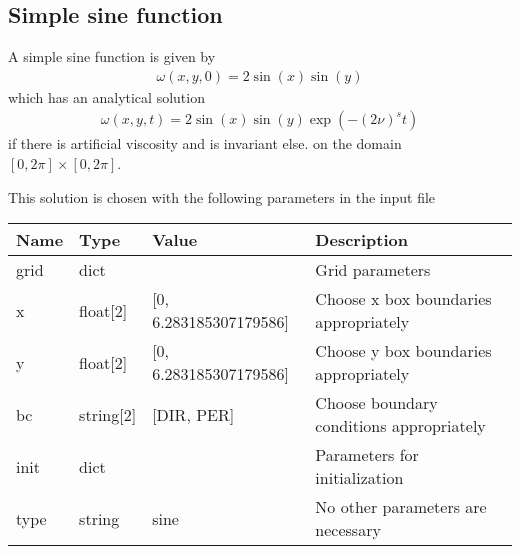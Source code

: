 \subsection{Simple sine function}
A simple sine function is given by
\begin{align}
    \omega(x,y,0) = 2 \sin(x)\sin(y)
\end{align}
which has an analytical solution
\begin{align}
\omega(x,y,t) = 2 \sin(x)\sin(y)\exp( -(2\nu)^s t)
\end{align}
if there is artificial viscosity and is invariant else.
on the domain $[0,2\pi]\times [0,2\pi]$.

This solution is chosen with the following parameters in the input file
\begin{longtable}{llll}
\toprule
\rowcolor{gray!50}\textbf{Name} &  \textbf{Type} & \textbf{Value}  & \textbf{Description}  \\ \midrule
grid & dict &  & Grid parameters \\
\qquad x & float[2]& [0, 6.283185307179586] & Choose x box boundaries appropriately \\
\qquad y & float[2]& [0, 6.283185307179586] & Choose y box boundaries appropriately \\
\qquad bc & string[2] & [DIR, PER] & Choose boundary conditions appropriately \\
init &  dict &   & Parameters for initialization \\
\qquad type      & string & sine & No other parameters are necessary \\
\bottomrule
\end{longtable}

